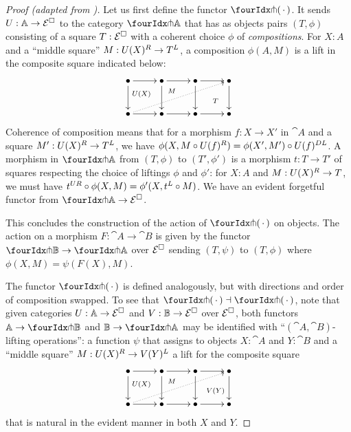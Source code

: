 \documentclass[reqno,10pt,a4paper,oneside]{amsart}
\begin{document}
\begin{proof}[Proof (adapted from \cite{garner:small-object-argument})]
Let us first define the functor $\liftr{\brarghole}$.
It sends $U : \mathbb{A} \to \mathcal{E}^{\Box}$ to the category $\liftr{\cat{A}}$ that has as objects pairs $(T, \phi)$ consisting of a square $T : \mathcal{E}^{\Box}$ with a coherent choice $\phi$ of \emph{compositions}.
For $X : A$ and a ``middle square'' $M : U(X){}^R \to T{}^L$, a composition $\phi(A, M)$ is a lift in the composite square indicated below:
\[
\xymatrix{
  \bullet
  \ar[r]
  \ar[d]
  \ar@{}[dr]|(0.4){U(X)}
&
  \bullet
  \ar[r]
  \ar[d]
  \ar@{}[dr]|(0.3){M}
&
  \bullet
  \ar[r]
  \ar[d]
  \ar@{}[dr]|(0.6){T}
&
  \bullet
  \ar[d]
\\
  \bullet
  \ar[r]
  \ar@{.>}[urrr]
&
  \bullet
  \ar[r]
&
  \bullet
  \ar[r]
&
  \bullet
}
\]
Coherence of composition means that for a morphism $f : X \to X'$ in $\cat{A}$ and a square $M' : U(X){}^R \to T{}^L$, we have $\phi(X, M \mathbin{\circ} U(f){}^R) = \phi(X', M') \mathbin{\circ} U(f){}^{DL}$.
A morphism in $\liftr{\cat{A}}$ from $(T, \phi)$ to $(T', \phi')$ is a morphism $t : T \to T'$ of squares respecting the choice of liftings $\phi$ and $\phi'$: for $X : A$ and $M : U(X){}^R \to T$, we must have $t{}^{UR} \mathbin{\circ} \phi(X, M) = \phi'(X, t{}^L \mathbin{\circ} M)$.
We have an evident forgetful functor from $\liftr{\cat{A}} \to \catE^{\Box}$.

This concludes the construction of the action of $\liftr{\brarghole}$ on objects.
The action on a morphism $F : \cat{A} \to \cat{B}$ is given by the functor $\liftr{\cat{B}} \to \liftr{\cat{A}}$ over $\mathcal{E}^{\Box}$ sending $(T, \psi)$ to $(T, \phi)$ where $\phi(X, M) = \psi(F(X), M)$.

The functor $\liftl{\brarghole}$ is defined analogously, but with directions and order of composition swapped.
To see that $\liftl{\brarghole} \dashv \liftr{\brarghole}$, note that given categories $U : \mathbb{A} \to \mathcal{E}^{\Box}$ and $V : \mathbb{B} \to \mathcal{E}^{\Box}$ over $\mathcal{E}^{\Box}$, both functors $\cat{A} \to \liftl{\cat{B}}$ and $\cat{B} \to \liftr{\cat{A}}$ may be identified with ``$(\cat{A}, \cat{B})$-lifting operations'': a function $\psi$ that assigns to objects $X : \cat{A}$ and $Y : \cat{B}$ and a ``middle square'' $M : U(X){}^R \to V(Y){}^L$ a lift for the composite square 
\[
\xymatrix{
  \bullet
  \ar[r]
  \ar[d]
  \ar@{}[dr]|(0.4){U(X)}
&
  \bullet
  \ar[r]
  \ar[d]
  \ar@{}[dr]|(0.3){M}
&
  \bullet
  \ar[r]
  \ar[d]
  \ar@{}[dr]|(0.6){V(Y)}
&
  \bullet
  \ar[d]
\\
  \bullet
  \ar[r]
  \ar@{.>}[urrr]
&
  \bullet
  \ar[r]
&
  \bullet
  \ar[r]
&
  \bullet
}
\]
that is natural in the evident manner in both $X$ and $Y$.
\end{proof}
\end{document}
